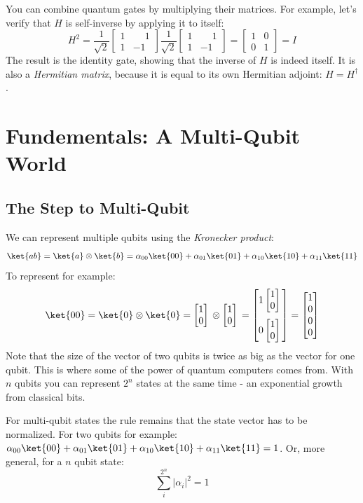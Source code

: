\documentclass[11pt]{article}
\newcommand{\igate}{
  \begin{bmatrix}
  1 & 0 \\
  0 & 1
  \end{bmatrix}
}
\newcommand{\hgate}{
  \dfrac{1}{\sqrt2}
  \begin{bmatrix}
  1 & \phantom{-}1 \\
  1 & -1
  \end{bmatrix}
}
\newcommand{\qstatezero}{
  \begin{bmatrix}1 \\ 0\end{bmatrix}
}
\begin{document}
You can combine quantum gates by multiplying their matrices. For example, let's verify that $H$ is self-inverse by applying it to itself:
\[
  H^2 = \hgate{} \hgate{} = \igate{} = I
\]
The result is the identity gate, showing that the inverse of $H$ is indeed itself. It is also a \emph{Hermitian matrix}, because it is equal to its own Hermitian adjoint: $H = H^\dagger$.

\newpage

\section{Fundementals: A Multi-Qubit World}
\subsection{The Step to Multi-Qubit}
We can represent multiple qubits using the \emph{Kronecker product}:
\[
  \ket{ab} = \ket{a} \otimes \ket{b} = \alpha_{00}\ket{00} + \alpha_{01}\ket{01} + \alpha_{10}\ket{10} + \alpha_{11}\ket{11}
\]
To represent  for example:
\[
  \ket{00} = \ket{0} \otimes \ket{0} = \qstatezero{} \otimes \qstatezero{} =
  \begin{bmatrix}
  1\qstatezero{} \\[13pt]
  0\qstatezero{}
  \end{bmatrix}
  =
  \begin{bmatrix}
  1 \\
  0 \\
  0 \\
  0
  \end{bmatrix}
\]
Note that the size of the vector of two qubits is twice as big as the vector for one qubit. This is where some of the power of quantum computers comes from. With $n$ qubits you can represent $2^n$ states at the same time - an exponential growth from classical bits.

For multi-qubit states the rule remains that the state vector has to be normalized. For two qubits for example: $\alpha_{00}\ket{00} + \alpha_{01}\ket{01} + \alpha_{10}\ket{10} + \alpha_{11}\ket{11} = 1$. Or, more general, for a $n$ qubit state:
\[
\sum_{i}^{2^n} |\alpha_i|^2 = 1
\]
\end{document}
